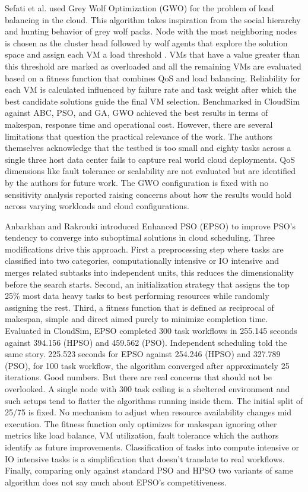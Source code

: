 \documentclass[pdflatex,sn-mathphys-num]{sn-jnl}%
\begin{document}
Sefati et al. \cite{GWO} used Grey Wolf Optimization (GWO) for the problem of load balancing in the cloud. This algorithm takes inspiration from the social hierarchy and hunting behavior of grey wolf packs. Node with the most neighboring nodes is chosen as the cluster head followed by wolf agents that explore the solution space and assign each VM a load threshold . VMs that have a value greater than this threshold are marked as overloaded and all the remaining VMs are evaluated based on a fitness function that combines QoS and load balancing. Reliability for each VM is calculated influenced by failure rate and task weight after which the best candidate solutions guide the final VM selection. Benchmarked in CloudSim against ABC, PSO, and GA, GWO achieved the best results in terms of makespan, response time and operational cost. However, there are several limitations that question the practical relevance of the work. The authors themselves acknowledge that the testbed is too small and eighty tasks across a single three host data center fails to capture real world cloud deployments. QoS dimensions like fault tolerance or scalability are not evaluated but are identified by the authors for future work. The GWO configuration is fixed with no sensitivity analysis reported raising concerns about how the results would hold across varying workloads and cloud configurations.

Anbarkhan and Rakrouki \cite{PSO} introduced Enhanced PSO (EPSO) to improve PSO’s tendency to converge into suboptimal solutions in cloud scheduling. Three modifications drive this approach. First a preprocessing step where tasks are classified into two categories, computationally intensive or IO intensive and merges related subtasks into independent units, this reduces the dimensionality before the search starts. Second, an initialization strategy that assigns the top 25\% most data heavy tasks to best performing resources while randomly assigning the rest. Third, a fitness function that is defined as reciprocal of makespan, simple and direct aimed purely to minimize completion time. Evaluated in CloudSim, EPSO completed 300 task workflows in 255.145 seconds against 394.156 (HPSO) and 459.562 (PSO). Independent scheduling told the same story. 225.523 seconds for EPSO against 254.246 (HPSO) and 327.789 (PSO), for 100 task workflow, the algorithm converged after approximately 25 iterations. Good numbers. But there are real concerns that should not be overlooked.  A single node with 300 task ceiling is a sheltered environment and such setups tend to flatter the algorithms running inside them. The initial split of 25/75 is fixed. No mechanism to adjust when resource availability changes mid execution. The fitness function only optimizes for makespan ignoring other metrics like load balance, VM utilization, fault tolerance which the authors identify as future improvements. Classification of tasks into compute intensive or IO intensive tasks is a simplification that doesn’t translate to real workflows. Finally, comparing only against standard PSO and HPSO two variants of same algorithm does not say much about EPSO’s competitiveness.
\end{document}
